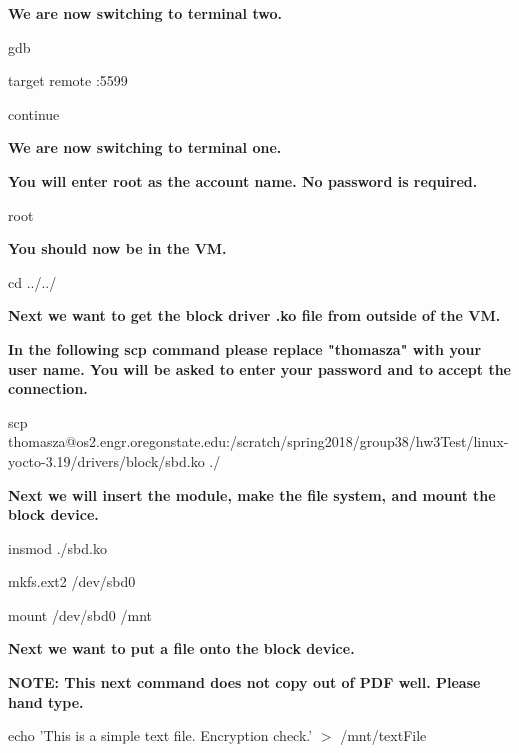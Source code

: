 \documentclass[journal,10pt,onecolumn,letterpaper,draftclsnofoot]{IEEEtran}
\begin{document}
\textbf{We are now switching to terminal two.\newline}

gdb\newline

target remote :5599\newline

continue\newline

\textbf{We are now switching to terminal one.\newline}

\textbf{You will enter root as the account name. No password is required.\newline}

root\newline

\textbf{You should now be in the VM.\newline}

cd ../../\newline

\textbf{Next we want to get the block driver .ko file from outside of the VM.\newline}

\textbf{In the following scp command please replace "thomasza" with your user name. You will be asked to enter your password and to accept the connection.\newline}

scp thomasza@os2.engr.oregonstate.edu:/scratch/spring2018/group38/hw3Test/linux-yocto-3.19/drivers/block/sbd.ko ./\newline

\textbf{Next we will insert the module, make the file system, and mount the block device.\newline}

insmod ./sbd.ko\newline

mkfs.ext2 /dev/sbd0\newline

mount /dev/sbd0 /mnt\newline

\textbf{Next we want to put a file onto the block device.\newline}

\textbf{NOTE: This next command does not copy out of PDF well. Please hand type.\newline}

echo 'This is a simple text file. Encryption check.' $>$ /mnt/textFile\newline
\end{document}
